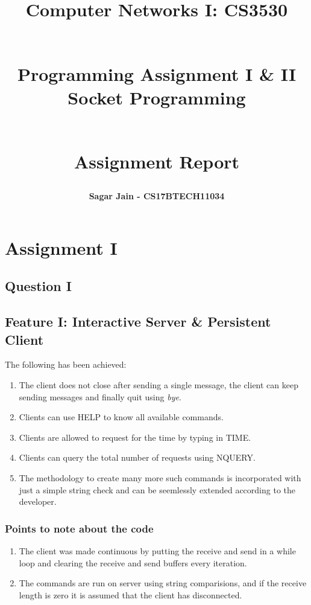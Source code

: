 \documentclass[a4paper,12pt]{report}
\begin{document}
\title{
\textbf{Computer Networks I: CS3530}\\~\\
\begin{large}
\textbf{Programming Assignment I \& II \\Socket Programming}\\~\\
\end{large}
\begin{large}
\textbf{Assignment Report}
\end{large}
}
\author{\textbf{Sagar Jain - CS17BTECH11034}\\}
\maketitle
\begin{large}
\tableofcontents
\end{large}
\newpage
\section{Assignment I}
\subsection{Question I}
\subsection{Feature I: Interactive Server \& Persistent Client}
The following has been achieved:
\begin{enumerate}
\item The client does not close after sending a single message, the client can keep sending messages and finally quit using \textit{bye}.
\item Clients can use HELP to know all available commands.
\item Clients are allowed to request for the time by typing in TIME.
\item Clients can query the total number of requests using NQUERY.
\item The methodology to create many more such commands is incorporated with just a simple string check and can be seemlessly extended according to the developer.
\end{enumerate}
\subsubsection{Points to note about the code}
\begin{enumerate}
\item The client was made continuous by putting the receive and send in a while loop and clearing the receive and send buffers every iteration.
\item The commands are run on server using string comparisions, and if the receive length is zero it is assumed that the client has disconnected.
\end{enumerate}
\end{document}
